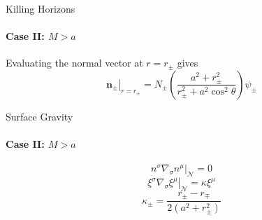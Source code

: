 \documentclass{beamer}
\begin{document}
  		\begin{frame}{Killing Horizons}
         \framesubtitle{Case II: $M>a$}
  			Evaluating the normal vector at $r=r_{\pm}$ gives
            $$\left. \mathbf{n}_{\pm} \right|_{r=r_{\pm}} = N_{\pm}\left(\frac{a^{2} + r_{\pm}^{2}}{r_{\pm}^{2}+a^{2} \cos^{2}\theta} \right) \psi_{\pm}$$
  		\end{frame}
        
    	\begin{frame}{Surface Gravity}
         \framesubtitle{Case II: $M>a$}
			$$\left.n^{\sigma} \nabla_{\sigma} n^{\mu} \right|_{\mathcal{N}} = 0$$
 		\pause
        $$ \left.\xi^{\sigma} \nabla_{\sigma} \xi^{\mu}\right|_{\mathcal{N}} = \kappa\xi^{\mu}$$
        \pause
        $$\kappa_{\pm}=\frac{r_{\pm}-r_{\mp}}{2\left(a^{2}+r_{\pm}^{2}\right)}$$
    	\end{frame}
        
    	
        
\end{document}
